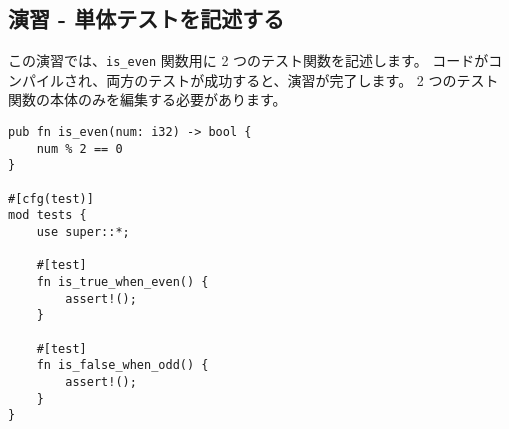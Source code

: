 \subsection{演習 - 単体テストを記述する}

この演習では、\texttt{is\_even} 関数用に 2 つのテスト関数を記述します。 コードがコンパイルされ、両方のテストが成功すると、演習が完了します。 2 つのテスト関数の本体のみを編集する必要があります。

\begin{lstlisting}[numbers=none]
pub fn is_even(num: i32) -> bool {
    num % 2 == 0
}

#[cfg(test)]
mod tests {
    use super::*;

    #[test]
    fn is_true_when_even() {
        assert!();
    }

    #[test]
    fn is_false_when_odd() {
        assert!();
    }
}
\end{lstlisting}